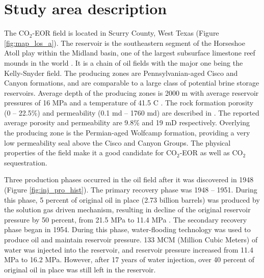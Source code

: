 \section{Study area description}
The CO$_{2}$-EOR field is located in Scurry County, West Texas (Figure \ref{fig:map_los_a}).  The reservoir is the southeastern segment of the Horseshoe Atoll play within the Midland basin, one of the largest subsurface limestone reef mounds in the world \cite[]{galloway1983atlas}.  It is a chain of oil fields with the major one being the Kelly-Snyder field.  The producing zones are Pennsylvanian-aged Cisco and Canyon formations, and are comparable to a large class of potential brine storage reservoirs.  Average depth of the producing zones is 2000 m \cite[]{vest1970oil,raines2001review} with average reservoir pressures of 16 MPa and a temperature of 41.5 \textordmasculine C \cite[]{raines66}.  The rock formation porosity (0 – 22.5\%) and permeability (0.1 md – 1760 md) are described in \citet{raines66}.  The reported average porosity and permeability are 9.8\% and 19 mD respectively.  Overlying the producing zone is the Permian-aged Wolfcamp formation, providing a very low permeability seal above the Cisco and Canyon Groups.  The physical properties of the field make it a good candidate for CO$_{2}$-EOR as well as CO$_{2}$ sequestration.

Three production phases occurred in the oil field after it was discovered in 1948 (Figure \ref{fig:inj_pro_hist}).  The primary recovery phase was 1948 – 1951.  During this phase, 5 percent of original oil in place (2.73 billion barrels) was produced by the solution gas driven mechanism, resulting in decline of the original reservoir pressure by 50 percent, from 21.5 MPa to 11.4 MPa \cite[]{dicharry1973evaluation,brummett1976reservoir}.  The secondary recovery phase began in 1954.  During this phase, water-flooding technology was used to produce oil and maintain reservoir pressure.  133 MCM (Million Cubic Meters) of water was injected into the reservoir, and reservoir pressure increased from 11.4 MPa to 16.2 MPa. However, after 17 years of water injection, over 40 percent of original oil in place was still left in the reservoir.

